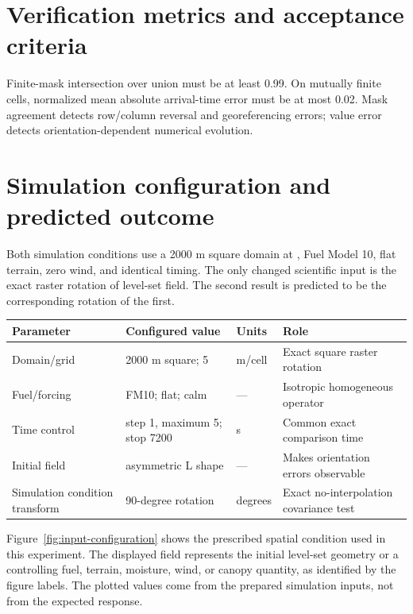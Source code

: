\section{Verification metrics and acceptance criteria}

Finite-mask intersection over union must be at least 0.99. On mutually finite cells, normalized mean absolute arrival-time error must be at most 0.02. Mask agreement detects row/column reversal and georeferencing errors; value error detects orientation-dependent numerical evolution.

\section{Simulation configuration and predicted outcome}

Both simulation conditions use a 2000 m square domain at \CellSize{}, Fuel Model 10, flat terrain, zero wind, and identical timing. The only changed scientific input is the exact raster rotation of level-set field. The second result is predicted to be the corresponding rotation of the first.

\begin{center}\begin{tabular}{p{}p{}p{}p{}}\toprule
Parameter & Configured value & Units & Role \\
\midrule Domain/grid & 2000 m square; 5 & m/cell & Exact square raster rotation \\
Fuel/forcing & FM10; flat; calm & --- & Isotropic homogeneous operator \\
Time control & step 1, maximum 5; stop 7200 & s & Common exact comparison time \\
Initial field & asymmetric L shape & --- & Makes orientation errors observable \\
Simulation condition transform & 90-degree rotation & degrees & Exact no-interpolation covariance test \\
\bottomrule\end{tabular}\end{center}

Figure~\ref{fig:input-configuration} shows the prescribed spatial condition used in this experiment. The displayed field represents the initial level-set geometry or a controlling fuel, terrain, moisture, wind, or canopy quantity, as identified by the figure labels. The plotted values come from the prepared simulation inputs, not from the expected response.

